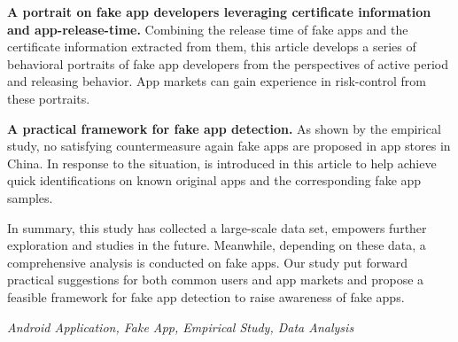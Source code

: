 \textbf{A portrait on fake app developers leveraging certificate information and app-release-time. }
Combining the release time of fake apps and the certificate information extracted from them, this article develops a series of behavioral portraits of fake app developers from the perspectives of active period and releasing behavior.
App markets can gain experience in risk-control from these portraits.

\textbf{A practical framework for fake app detection. }
As shown by the empirical study, no satisfying countermeasure again fake apps are proposed in app stores in China.
In response to the situation, \mytool is introduced in this article to help achieve quick identifications on known original apps and the corresponding fake app samples.

In summary, this study has collected a large-scale data set, empowers further exploration and studies in the future.
Meanwhile, depending on these data, a comprehensive analysis is conducted on fake apps. 
Our study put forward practical suggestions for both common users and app markets and propose a feasible framework for fake app detection to raise awareness of fake apps.

{} \textit{Android Application, Fake App, Empirical Study, Data Analysis}
